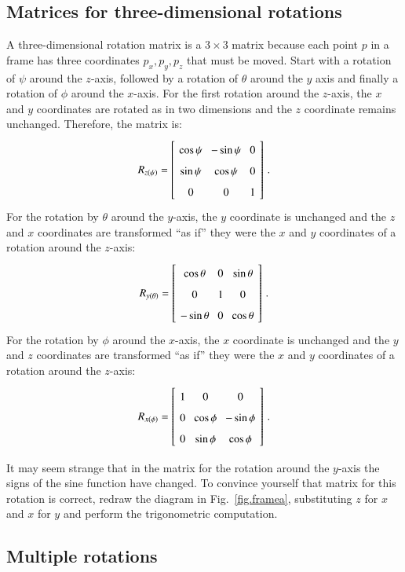 \subsection{Matrices for three-dimensional rotations}

A three-dimensional rotation matrix is a $3\times 3$ matrix because each point $p$ in a frame has three coordinates $p_x,p_y,p_z$ that must be moved. 
Start with a rotation of $\psi$ around the $z$-axis, followed by a rotation of $\theta$ around the $y$ axis and finally a rotation of $\phi$ around the $x$-axis. For the first rotation around the $z$-axis, the $x$ and $y$ coordinates are rotated as in two dimensions and the $z$ coordinate remains unchanged. Therefore, the matrix is:
\[
\spacearray
R_{z(\psi)}=\left[\begin{array}{ccc}\cos\psi&-\sin\psi&0\\\sin\psi&\cos\psi&0\\0&0&1\end{array}\right]\,.
\]
For the rotation by $\theta$ around the $y$-axis, the $y$ coordinate is unchanged and the $z$ and $x$ coordinates are transformed ``as if'' they were the $x$ and $y$ coordinates of a rotation around the $z$-axis:
\[
\spacearray
R_{y(\theta)}=\left[\begin{array}{ccc}\cos\theta&0&\sin\theta\\0&1&0\\-\sin\theta&0&\cos\theta\\\end{array}\right]\,.
\]
For the rotation by $\phi$ around the $x$-axis, the $x$ coordinate is unchanged and the $y$ and $z$ coordinates are transformed ``as if'' they were the $x$ and $y$ coordinates of a rotation around the $z$-axis:
\[
\spacearray
R_{x(\phi)}=\left[\begin{array}{ccc}1&0&0\\0&\cos\phi&-\sin\phi\\0&\sin\phi&\cos\phi\\\end{array}\right]\,.
\]

It may seem strange that in the matrix for the rotation around the $y$-axis  the signs of the sine function have changed. To convince yourself that matrix for this rotation is correct, redraw the diagram in Fig.~\ref{fig.framea}, substituting $z$ for $x$ and $x$ for $y$ and perform the trigonometric computation.

\subsection{Multiple rotations}

